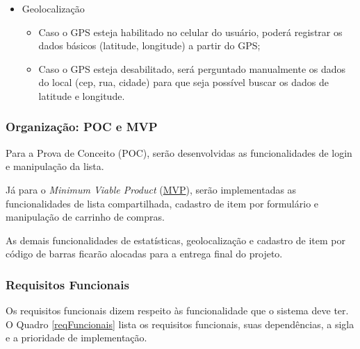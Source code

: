 \begin{itemize}
	\item Geolocalização
		\begin{itemize}
			\item Caso o GPS esteja habilitado no celular do usuário, poderá registrar os dados básicos (latitude, longitude) a partir do GPS;
			\item Caso o GPS esteja desabilitado, será perguntado manualmente os dados do local (cep, rua, cidade) para que seja possível buscar os dados de latitude e longitude.
		\end{itemize}
\end{itemize}

\subsubsection{Organização: POC e MVP}

Para a Prova de Conceito (POC), serão desenvolvidas as funcionalidades de login e manipulação da lista.

Já para o \textit{Minimum Viable Product} (\label{sig:mvp}\hyperlink{s:mvp}{MVP}), serão implementadas as funcionalidades de lista compartilhada, cadastro de item por formulário e manipulação de carrinho de compras. 

As demais funcionalidades de estatísticas, geolocalização e cadastro de item por código de barras ficarão alocadas para a entrega final do projeto.

\subsubsection{Requisitos Funcionais}

Os requisitos funcionais dizem respeito às funcionalidade que o sistema deve ter. O Quadro \ref{reqFuncionais} lista os requisitos funcionais, suas dependências, a sigla e a prioridade de implementação.

